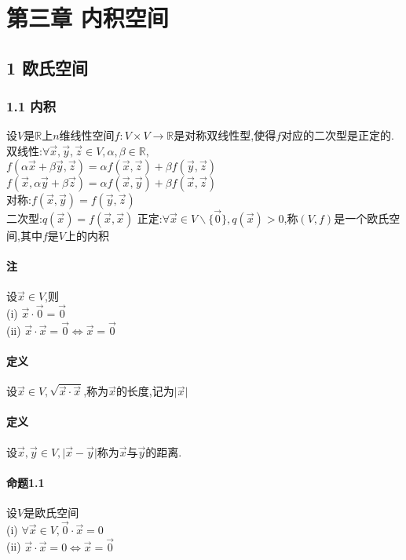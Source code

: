 \documentclass{ctexart}
\begin{document}
\fi
\section{第三章 内积空间}
\subsection{1 欧氏空间}
\subsubsection{1.1 内积}
设$V$是$\mathbb{R}$上$n$维线性空间$f: V \times V \rightarrow \mathbb{R}$是对称双线性型,使得$f$对应的二次型是正定的.\\
双线性:$\forall \vec{x},\vec{y},\vec{z} \in V,\alpha,\beta \in \mathbb{R},$\\
$f(\alpha\vec{x}+\beta\vec{y},\vec{z}) = \alpha f(\vec{x},\vec{z})+\beta f(\vec{y},\vec{z})$\\
$f(\vec{x},\alpha\vec{y}+\beta\vec{z}) = \alpha f(\vec{x},\vec{y})+\beta f(\vec{x},\vec{z})$\\
对称:$f(\vec{x},\vec{y})=f(\vec{y},\vec{z})$\\
二次型:$q(\vec{x}) = f(\vec{x},\vec{x})$
正定:$\forall \vec{x} \in V \backslash \{ \vec{0} \},q(\vec{x}) > 0$,称$(V,f)$是一个欧氏空间,其中$f$是$V$上的内积

\paragraph{注}
设$\vec{x} \in V$,则\\
(i) $\vec{x}\cdot \vec{0} = \vec{0}$\\
(ii) $\vec{x} \cdot \vec{x} = \vec{0} \Leftrightarrow \vec{x} = \vec{0}$

\paragraph{定义}
设$\vec{x} \in V,\sqrt{\vec{x} \cdot \vec{x}}$,称为$\vec{x}$的长度,记为$\vert \vec{x} \vert$

\paragraph{定义}
设$\vec{x},\vec{y} \in V, \vert \vec{x}-\vec{y} \vert$称为$\vec{x}$与$\vec{y}$的距离.


\paragraph{命题1.1}
设$V$是欧氏空间\\
(i) $\forall \vec{x} \in V, \vec{0} \cdot \vec{x} = 0$\\
(ii) $\vec{x}\cdot\vec{x} = 0 \Leftrightarrow \vec{x} = \vec{0}$
\end{document}
